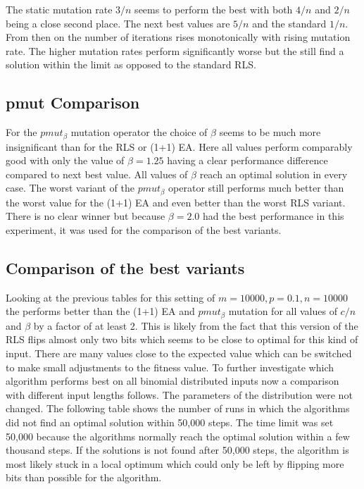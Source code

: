 
The static mutation rate $3/n$ seems to perform the best with both $4/n$ and $2/n$ being a close second place.
The next best values are $5/n$ and the standard $1/n$.
From then on the number of iterations rises monotonically with rising mutation rate.
The higher mutation rates perform significantly worse but the still find a solution within the limit as opposed to the standard RLS.
\subsection{pmut Comparison}


For the $pmut_\beta$ mutation operator the choice of $\beta$ seems to be much more insignificant than for the RLS or (1+1) EA. Here all values perform comparably good with only the value of $\beta = 1.25$ having a clear performance difference compared to next best value. All values of $\beta$ reach an optimal solution in every case. The worst variant of the $pmut_\beta$ operator still performs much better than the worst value for the (1+1) EA and even better than the worst RLS variant. There is no clear winner but because $\beta=2.0$ had the best performance in this experiment, it was used for the comparison of the best variants.
\subsection{Comparison of the best variants}
% 
% 
Looking at the previous tables for this setting of $m=10000, p=0.1, n=10000$ the \RLSN[2] performs better than the  (1+1) EA and $pmut_\beta$ mutation for all values of $c/n$ and $\beta$ by a factor of at least 2.
This is likely from the fact that this version of the RLS flips almost only two bits which seems to be close to optimal for this kind of input.
There are many values close to the expected value which can be switched to make small adjustments to the fitness value.
To further investigate which algorithm performs best on all binomial distributed inputs now a comparison with different input lengths follows.
The parameters of the distribution were not changed.\newline
The following table shows the number of runs in which the algorithms did not find an optimal solution within 50,000 steps.
The time limit was set 50,000 because the algorithms normally reach the optimal solution within a few thousand steps.
If the solutions is not found after 50,000 steps, the algorithm is most likely stuck in a local optimum which could only be left by flipping more bits than possible for the algorithm.

